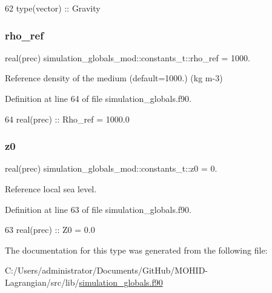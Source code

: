 \begin{DoxyCode}
62         \textcolor{keywordtype}{type}(vector) :: Gravity
\end{DoxyCode}
\mbox{\label{structsimulation__globals__mod_1_1constants__t_a7e4a2bb5206340621bfce6792b527f6d}} 
\subsubsection{\texorpdfstring{rho\+\_\+ref}{rho\_ref}}
{\footnotesize\ttfamily real(prec) simulation\+\_\+globals\+\_\+mod\+::constants\+\_\+t\+::rho\+\_\+ref = 1000.\hspace{0.3cm}{\ttfamily [private]}}



Reference density of the medium (default=1000.) (kg m-\/3) 



Definition at line 64 of file simulation\+\_\+globals.\+f90.


\begin{DoxyCode}
64         \textcolor{keywordtype}{real(prec)}   :: Rho\_ref = 1000.0
\end{DoxyCode}
\mbox{\label{structsimulation__globals__mod_1_1constants__t_a737e824cf720aea683fe23939d12aa5b}} 
\subsubsection{\texorpdfstring{z0}{z0}}
{\footnotesize\ttfamily real(prec) simulation\+\_\+globals\+\_\+mod\+::constants\+\_\+t\+::z0 = 0.\hspace{0.3cm}{\ttfamily [private]}}



Reference local sea level. 



Definition at line 63 of file simulation\+\_\+globals.\+f90.


\begin{DoxyCode}
63         \textcolor{keywordtype}{real(prec)}   :: Z0 = 0.0
\end{DoxyCode}


The documentation for this type was generated from the following file\+:\begin{DoxyCompactItemize}
\item 
C\+:/\+Users/administrator/\+Documents/\+Git\+Hub/\+M\+O\+H\+I\+D-\/\+Lagrangian/src/lib/\mbox{\hyperlink{simulation__globals_8f90}{simulation\+\_\+globals.\+f90}}\end{DoxyCompactItemize}

